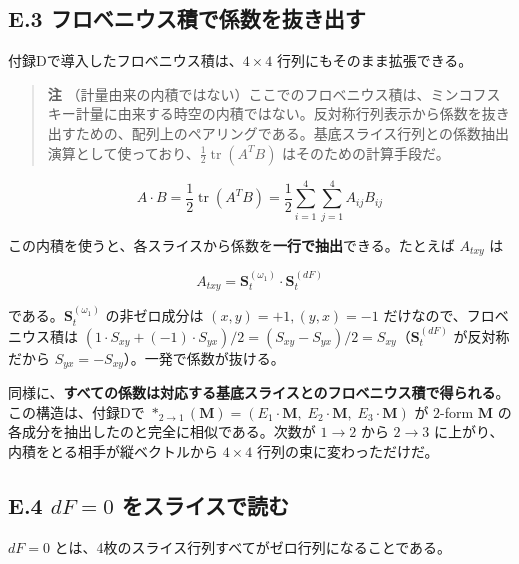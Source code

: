 \documentclass[a4paper,12pt,openany]{book}
\begin{document}
\hypertarget{e.3-ux30d5ux30edux30d9ux30cbux30a6ux30b9ux7a4dux3067ux4fc2ux6570ux3092ux629cux304dux51faux3059}{%
\subsection*{E.3
フロベニウス積で係数を抜き出す}\label{e.3-ux30d5ux30edux30d9ux30cbux30a6ux30b9ux7a4dux3067ux4fc2ux6570ux3092ux629cux304dux51faux3059}}

付録Dで導入したフロベニウス積は、\(4\times4\)
行列にもそのまま拡張できる。

\begin{quote}
\textbf{注}
（計量由来の内積ではない）ここでのフロベニウス積は、ミンコフスキー計量に由来する時空の内積ではない。反対称行列表示から係数を抜き出すための、配列上のペアリングである。基底スライス行列との係数抽出演算として使っており、\(\frac{1}{2}\operatorname{tr}(A^T B)\)
はそのための計算手段だ。
\end{quote}

\[
A \cdot B = \frac{1}{2}\operatorname{tr}(A^T B) = \frac{1}{2}\sum_{i=1}^{4}\sum_{j=1}^{4} A_{ij}B_{ij}
\]

この内積を使うと、各スライスから係数を\textbf{一行で抽出}できる。たとえば
\(A_{txy}\) は

\[
A_{txy} = \mathbf{S}_{t}^{(\omega_1)} \cdot \mathbf{S}_{t}^{(dF)}
\]

である。\(\mathbf{S}_{t}^{(\omega_1)}\) の非ゼロ成分は
\((x,y)=+1, (y,x)=-1\) だけなので、フロベニウス積は
\((1 \cdot S_{xy} + (-1) \cdot S_{yx})/2 = (S_{xy} - S_{yx})/2 = S_{xy}\)（\(\mathbf{S}_{t}^{(dF)}\)
が反対称だから \(S_{yx}=-S_{xy}\)）。一発で係数が抜ける。

同様に、\textbf{すべての係数は対応する基底スライスとのフロベニウス積で得られる}。この構造は、付録Dで
\(\ast_{2\to1}(\mathbf{M}) = (E_1\!\cdot\!\mathbf{M},\;E_2\!\cdot\!\mathbf{M},\;E_3\!\cdot\!\mathbf{M})\)
が \(2\)-form \(\mathbf{M}\)
の各成分を抽出したのと完全に相似である。次数が \(1\to2\) から \(2\to3\)
に上がり、内積をとる相手が縦ベクトルから \(4\times4\)
行列の束に変わっただけだ。

\hypertarget{e.4-df0-ux3092ux30b9ux30e9ux30a4ux30b9ux3067ux8aadux3080}{%
\subsection*{\texorpdfstring{E.4 \(dF=0\)
をスライスで読む}{E.4 dF=0 をスライスで読む}}\label{e.4-df0-ux3092ux30b9ux30e9ux30a4ux30b9ux3067ux8aadux3080}}

\(dF=0\) とは、4枚のスライス行列すべてがゼロ行列になることである。
\end{document}
